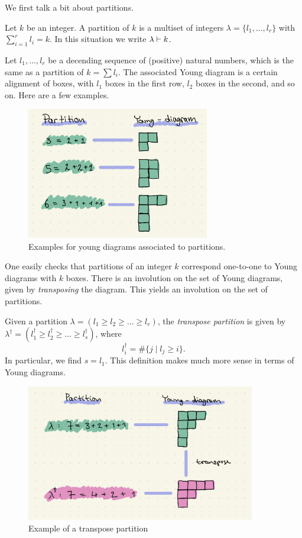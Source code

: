\documentclass[../main.tex]{subfiles}
\begin{document}
We first talk a bit about partitions.
\begin{defi}[Partition]
    Let $k$ be an integer. A partition of $k$ is a multiset of integers
    $\lambda = \{l_1, \dots, l_r\}$ with $\sum_{i = 1}^r l_i = k$. In this 
    situation we write $\lambda \vdash k$.
\end{defi}
\begin{defi}
    Let $l_1, \dots, l_r$ be a decending sequence of (positive) natural numbers,
    which is the same as a partition of $k = \sum l_i$. 
    The associated Young diagram is a certain alignment of boxes, with
    $l_1$ boxes in the first row, $l_2$ boxes in the second, and so on. 
    Here are a few examples.
    \begin{figure}[h]
        \centering
        \includegraphics[width=8cm]{youngdiagram.jpeg}
        \caption{Examples for young diagrams associated to partitions.}
    \end{figure}
\end{defi}
One easily checks that partitions of an integer $k$ correspond one-to-one to
Young diagrams with $k$ boxes.
There is an involution on the set of Young diagrams, given by \emph{transposing}
the diagram. This yields an involution on the set of partitions.
\begin{defi}
    Given a partition $\lambda = (l_1 \geq l_2 \geq \dots \geq l_r)$, the 
    \emph{transpose partition} is given by $\lambda^\dagger = 
    (l^\dagger_1 \geq l^\dagger_2 \geq \dots \geq l^\dagger_s)$, where
    \begin{equation*}
        l^\dagger_i = \# \{j \mid l_j \geq i\}.
    \end{equation*}
    In particular, we find $s = l_1$.
    This definition makes much more sense in terms of Young diagrams.
    \begin{figure}[H]
        \centering
        \includegraphics[width=10cm]{transpose.jpeg}
        \caption{Example of a transpose partition}
    \end{figure}
\end{defi}
\end{document}
